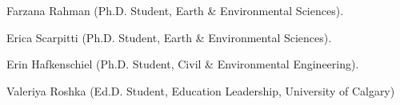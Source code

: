 \item Farzana Rahman (Ph.D. Student, Earth \& Environmental Sciences).
\item Erica Scarpitti (Ph.D. Student, Earth \& Environmental Sciences).
\item Erin Hafkenschiel (Ph.D. Student, Civil \& Environmental Engineering).
\item Valeriya Roshka (Ed.D. Student, Education Leadership, University of Calgary)